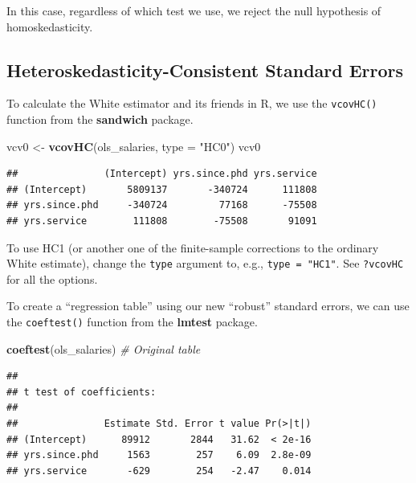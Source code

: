 \documentclass[12pt,oneside,openany]{book}
\newenvironment{Shaded}{\begin{snugshade}}{\end{snugshade}}
\newcommand{\KeywordTok}[1]{\textcolor[rgb]{0.13,0.29,0.53}{\textbf{#1}}}
\newcommand{\DataTypeTok}[1]{\textcolor[rgb]{0.13,0.29,0.53}{#1}}
\newcommand{\StringTok}[1]{\textcolor[rgb]{0.31,0.60,0.02}{#1}}
\newcommand{\CommentTok}[1]{\textcolor[rgb]{0.56,0.35,0.01}{\textit{#1}}}
\newcommand{\NormalTok}[1]{#1}
\begin{document}
In this case, regardless of which test we use, we reject the null
hypothesis of homoskedasticity.

\subsection{Heteroskedasticity-Consistent Standard
Errors}\label{heteroskedasticity-consistent-standard-errors}

To calculate the White estimator and its friends in R, we use the
\texttt{vcovHC()} function from the \textbf{sandwich} package.

\begin{Shaded}
\begin{Highlighting}[]
\NormalTok{vcv0 <-}\StringTok{ }\KeywordTok{vcovHC}\NormalTok{(ols_salaries, }\DataTypeTok{type =} \StringTok{"HC0"}\NormalTok{)}
\NormalTok{vcv0}
\end{Highlighting}
\end{Shaded}

\begin{verbatim}
##               (Intercept) yrs.since.phd yrs.service
## (Intercept)       5809137       -340724      111808
## yrs.since.phd     -340724         77168      -75508
## yrs.service        111808        -75508       91091
\end{verbatim}

To use HC1 (or another one of the finite-sample corrections to the
ordinary White estimate), change the \texttt{type} argument to, e.g.,
\texttt{type\ =\ "HC1"}. See \texttt{?vcovHC} for all the options.

To create a ``regression table'' using our new ``robust'' standard
errors, we can use the \texttt{coeftest()} function from the
\textbf{lmtest} package.

\begin{Shaded}
\begin{Highlighting}[]
\KeywordTok{coeftest}\NormalTok{(ols_salaries)  }\CommentTok{# Original table}
\end{Highlighting}
\end{Shaded}

\begin{verbatim}
## 
## t test of coefficients:
## 
##               Estimate Std. Error t value Pr(>|t|)
## (Intercept)      89912       2844   31.62  < 2e-16
## yrs.since.phd     1563        257    6.09  2.8e-09
## yrs.service       -629        254   -2.47    0.014
\end{verbatim}
\end{document}

